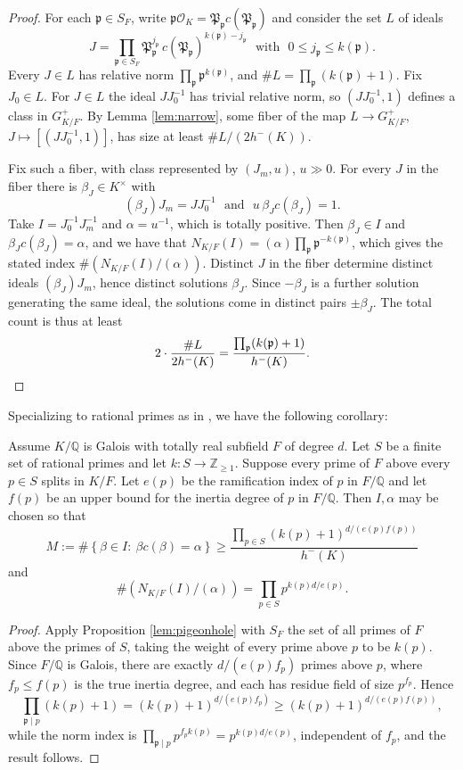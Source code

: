 \begin{proof}
For each $\mathfrak p\in S_F$, write $\mathfrak p\mathcal{O}_K=\mathfrak P_{\mathfrak p}c(\mathfrak P_{\mathfrak p})$ and consider the set $L$ of ideals
\[
   J=\prod_{\mathfrak p\in S_F}\mathfrak P_{\mathfrak p}^{j_{\mathfrak p}}\,
   c(\mathfrak P_{\mathfrak p})^{k(\mathfrak p)-j_{\mathfrak p}}
   \ \ \ \text{with}\ \ \ 0\leq j_{\mathfrak p}\leq k(\mathfrak p).
\]
Every $J\in L$ has relative norm $\prod_{\mathfrak p}\mathfrak p^{k(\mathfrak p)}$, and $\#L=\prod_{\mathfrak p}(k(\mathfrak p)+1)$.  Fix $J_0\in L$.  For $J\in L$ the ideal $JJ_0^{-1}$ has trivial relative norm, so $(JJ_0^{-1},1)$ defines a class in $G_{K/F}^+$.  By Lemma \ref{lem:narrow}, some fiber of the map $L\to G^+_{K/F}$, $J\mapsto[(JJ_0^{-1},1)]$, has size at least $\#L/(2h^-(K))$.

Fix such a fiber, with class represented by $(J_m,u)$, $u\gg0$.  For every $J$ in the fiber there is $\beta_J\in K^\times$ with
\[
   (\beta_J)J_m=JJ_0^{-1}
   \ \ \ \text{and}\ \ \ u\,\beta_J c(\beta_J)=1.
\]
Take $I=J_0^{-1}J_m^{-1}$ and $\alpha=u^{-1}$, which is totally positive.  Then $\beta_J\in I$ and $\beta_J c(\beta_J)=\alpha$, and we have that $N_{K/F}(I)=(\alpha)\prod_{\mathfrak p}\mathfrak p^{-k(\mathfrak p)}$, which gives the stated index $\#(N_{K/F}(I)/(\alpha))$.  Distinct $J$ in the fiber determine distinct ideals $(\beta_J)J_m$, hence distinct solutions $\beta_J$.  Since $-\beta_J$ is a further solution generating the same ideal, the solutions come in distinct pairs $\pm\beta_J$.  The total count is thus at least
\[
   2\cdot\frac{\#L}{2h^-(K)}=\frac{\prod_{\mathfrak p}(k(\mathfrak p)+1)}{h^-(K)}.
   \qedhere
\]
\end{proof}

Specializing to rational primes as in \cite[Lemma 8]{Sawin}, we have the following corollary:
\begin{corollary}\label{cor:rational}
Assume $K/\mathbb{Q}$ is Galois with totally real subfield $F$ of degree $d$.  Let $S$ be a finite set of rational primes and let $k:S\to\mathbb{Z}_{\geq1}$.  Suppose every prime of $F$ above every $p\in S$ splits in $K/F$.  Let $e(p)$ be the ramification index of $p$ in $F/\mathbb{Q}$ and let $f(p)$ be an upper bound for the inertia degree of $p$ in $F/\mathbb{Q}$.  Then $I,\alpha$ may be chosen so that
\[
   M:=\#\left\{\beta\in I:\ \beta c(\beta)=\alpha\right\}
   \geq \frac{\prod_{p\in S}(k(p)+1)^{d/(e(p)f(p))}}{h^-(K)}
\]
and
\[
   \#(N_{K/F}(I)/(\alpha))=\prod_{p\in S}p^{k(p)d/e(p)}.
\]
\end{corollary}

\begin{proof}
Apply Proposition \ref{lem:pigeonhole} with $S_F$ the set of all primes of $F$ above the primes of $S$, taking the weight of every prime above $p$ to be $k(p)$.  Since $F/\mathbb{Q}$ is Galois, there are exactly $d/(e(p)f_p)$ primes above $p$, where $f_p\leq f(p)$ is the true inertia degree, and each has residue field of size $p^{f_p}$.  Hence
\[
   \prod_{\mathfrak p\mid p}(k(p)+1)=(k(p)+1)^{d/(e(p)f_p)}\geq(k(p)+1)^{d/(e(p)f(p))},
\]
while the norm index is $\prod_{\mathfrak p\mid p}p^{f_pk(p)}=p^{k(p)d/e(p)}$, independent of $f_p$, and the result follows.
\end{proof}
